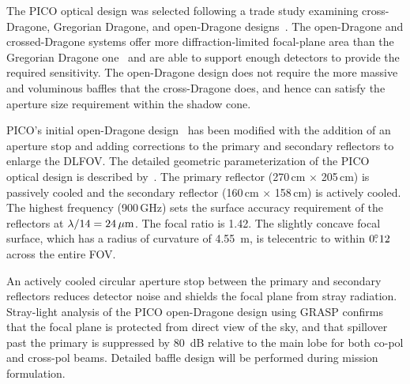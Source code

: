 
The PICO optical design was selected following a trade study examining cross-Dragone, Gregorian Dragone, and open-Dragone designs~\citep{Young2018}.  The open-Dragone and crossed-Dragone systems offer more diffraction-limited focal-plane area than the Gregorian Dragone one~\citep{deBernardis2018} and are able to support enough detectors to provide the required sensitivity. The open-Dragone design does not require the more massive and voluminous baffles that the cross-Dragone does, and hence can satisfy the aperture size requirement within the shadow cone.

PICO's initial open-Dragone design~\citep{dragone78, granet2001} has been modified with the addition of an aperture stop and adding corrections to the primary and secondary reflectors to enlarge the DLFOV. The detailed geometric parameterization of the PICO optical design is described by~\citet{Young2018}. The primary reflector (270\,cm $\times$ 205\,cm) is passively cooled and the secondary reflector (160\,cm $\times$ 158\,cm) is actively cooled. The highest frequency (900\,GHz) sets the surface accuracy requirement of the reflectors at $\lambda/14 =24\,\mu{\rm m}$. The focal ratio is 1.42. The slightly concave focal surface, which has a radius of curvature of 4.55~m, is telecentric to within $0.\!\!^\circ12$ across the entire FOV.

An actively cooled circular aperture stop between the primary and secondary reflectors reduces detector noise and shields the focal plane from stray radiation. Stray-light analysis of the PICO open-Dragone design using GRASP confirms that the focal plane is protected from direct view of the sky, and that spillover past the primary is suppressed by 80~dB relative to the main lobe for both co-pol and cross-pol beams. Detailed baffle design will be performed during mission formulation.

